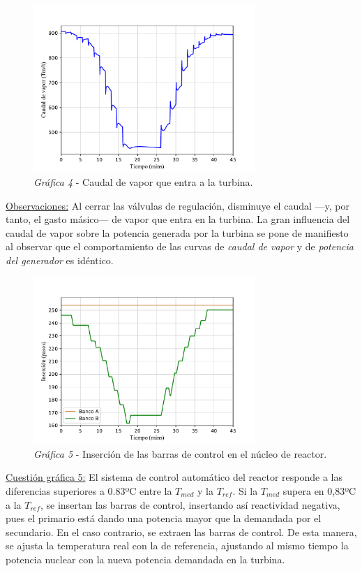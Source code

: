 \begin{figure}[h]
  \centering
  \includegraphics[width=0.75\textwidth]{content/figures/sim1_vapor.pdf}
  \caption{\textit{Gráfica 4} - Caudal de vapor que entra a la turbina.}
  \label{fig:sim1_vapor}
\end{figure}

\underline{Observaciones:} Al cerrar las válvulas de regulación, disminuye el caudal ---y, por tanto, el gasto másico--- de vapor que entra en la turbina. La gran influencia del caudal de vapor sobre la potencia generada por la turbina se pone de manifiesto al observar que el comportamiento de las curvas de \textit{caudal de vapor} y de \textit{potencia del generador} es idéntico.

\begin{figure}[!h]
  \centering
  \includegraphics[width=0.75\textwidth]{content/figures/sim1_barras_control.pdf}
  \caption{\textit{Gráfica 5} - Inserción de las barras de control en el núcleo de reactor.}
  \label{fig:sim1_barras_control}
\end{figure}

\underline{Cuestión gráfica 5:} El sistema de control automático del reactor responde a las diferencias superiores a 0.83ºC entre la $T_{med}$ y la $T_{ref}$. Si la $T_{med}$ supera en 0,83ºC a la $T_{ref}$, se insertan las barras de control, insertando así reactividad negativa, pues el primario está dando una potencia mayor que la demandada por el secundario. En el caso contrario, se extraen las barras de control. De esta manera, se ajusta la temperatura real con la de referencia, ajustando al mismo tiempo la potencia nuclear con la nueva potencia demandada en la turbina.

